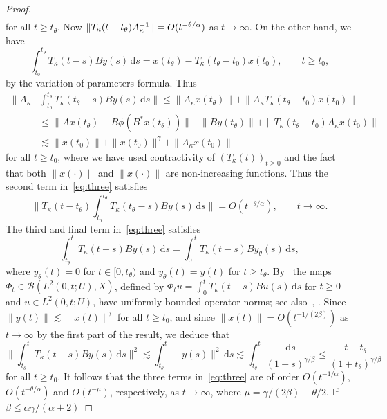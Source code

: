 \documentclass[10pt,a4paper]{amsart}
\newcommand{\B}{\mathcal{B}}
\newcommand{\dd}{\mathrm{d}}
\newcommand{\inv}{^{-1}}
\begin{document}
\begin{proof}
$$\begin{aligned}
\end{aligned}$$
 for all $t\ge t_\theta$. Now $\|T_\kappa (t-t_\theta)\smash{A_\kappa\inv}\|=O(t^{-\theta/\alpha})$ as $t\to\infty$. On the other hand,  we have 
$$ \int_{t_0}^{t_\theta} T_\kappa (t-s)By(s)\,\dd s = x(t_\theta)-T_\kappa (t_\theta-t_0)x(t_0),\qquad t\ge t_0,$$ 
by the variation of parameters formula. Thus 
$$\begin{aligned}
\bigg\|A_\kappa&\int_{t_0}^{t_\theta} T_\kappa (t_\theta-s)By(s)\,\dd s\bigg\|\le \|A_\kappa x(t_\theta)\|+\|A_\kappa T_\kappa (t_\theta-t_0)x(t_0)\|\\
&\le  \|Ax(t_\theta) - B\phi(B^\ast x(t_\theta))\|+\|By(t_\theta)\|+\|T_\kappa (t_\theta-t_0)A_\kappa x(t_0)\|\\
&\lesssim \|\dot{x}(t_0)\|+\|x(t_0)\|^\gamma+\|A_\kappa x(t_0)\|
\end{aligned}$$
for all $t\ge t_0$, where we have used contractivity of $(T_\kappa(t))_{t\ge0}$ and the fact that both $\|x(\cdot)\|$ and $\|\dot x(\cdot)\|$ are non-increasing functions. Thus the second term in~\eqref{eq:three} satisfies
$$\bigg\|T_\kappa (t-t_\theta)\int_{t_0}^{t_\theta} T_\kappa (t_\theta-s)By(s)\,\dd s\bigg\|=O({t^{-\theta/\alpha}}),\qquad t\to\infty.$$
The third and final term in~\eqref{eq:three} satisfies
$$ \int_{t_\theta}^t T_\kappa (t-s)By(s)\,\dd s
= \int_{0}^t T_\kappa (t-s)By_\theta(s)\,\dd s,$$
where $y_\theta(t)=0$ for $t\in[0,t_\theta)$ and $y_\theta(t)=y(t)$ for $t\ge t_\theta$. By~\cite[Lem.~2.2.6]{Oos00book} the maps $\Phi_t\in\B(L^2(0,t;U),X)$, defined by $\Phi_t u=\int_0^t T_\kappa (t-s)Bu(s)\,\dd s$ for $t\ge 0$ and $u\in L^2(0,t;U)$, have uniformly bounded operator norms; see also~\cite[Thm.~6.5.6]{CurZwa20book}, \cite[Cor.~6.1]{Sta02}. Since $\|y(t)\|\lesssim \|x(t)\|^\gamma$ for all $t\ge t_0$, and since $\|x(t)\|=O(t^{-1/(2\beta)})$ as $t\to\infty$ by the first part of the result, we deduce that
$$\bigg\| \int_{t_\theta}^t T_\kappa (t-s)By(s)\,\dd s\bigg\|^2\lesssim  \int_{t_\theta}^t \|y(s)\|^2\,\dd s\lesssim\int_{t_\theta}^t\frac{\dd s}{(1+s)^{\gamma/\beta}}\le\frac{t-t_\theta}{(1+t_\theta)^{\gamma/\beta}}$$
for all $t\ge t_0$.
It follows that the three terms in~\eqref{eq:three} are of order
$O(t^{-1/\alpha})$, $O(t^{-\theta/\alpha})$ and  $O(t^{-\mu})$, respectively, as $t\to\infty$, where  $\mu=\gamma/(2\beta)-\theta/2$. If  $\beta\le \alpha\gamma/(\alpha+2)$

\end{proof}
\end{document}
